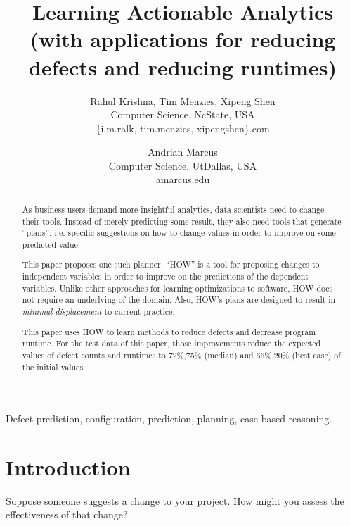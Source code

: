 \documentclass[conference]{IEEEtran}
\title{Learning Actionable Analytics 
 (with applications for reducing defects and reducing runtimes)}
\author{
%
%
Rahul Krishna, Tim Menzies, Xipeng Shen\\
        Computer Science, NcState, USA\\
       \{i.m.ralk, tim.menzies, xipengshen\}\@gmail.com
\and
 Andrian Marcus\\
       Computer Science, UtDallas, USA \\
       amarcus\@utdallas.edu }
\begin{document}
  \maketitle
  
  
   
  \begin{abstract}
 As business users demand more insightful
 analytics, data scientists need to change
 their tools. Instead of merely predicting 
 some result, they also need tools that generate ``plans'';
 i.e. specific suggestions on  how to change values in order to
 improve on some predicted value.
 
 This paper proposes one such planner. ``HOW'' is a 
 tool for proposing changes to independent
 variables in order to improve on 
 the predictions of the dependent variables. Unlike other approaches
 for learning optimizations to software, HOW does not require
 an underlying of the domain. Also, HOW's plans
 are designed to result in {\em minimal displacement}
 to current practice.
 
 This paper uses  HOW to learn methods
 to reduce defects and decrease program runtime.
 For the test data of this paper, those improvements   reduce
 the expected values of defect counts and  runtimes to    
 72\%,75\%  (median) and 66\%,20\% (best case) of the initial values.
  \end{abstract}
  \begin{IEEEkeywords}
Defect prediction, configuration, prediction, planning, case-based reasoning.
  \end{IEEEkeywords}
  
\section{Introduction}
Suppose someone suggests a change to your project. How might you assess the effectiveness of that change?
\end{document}
